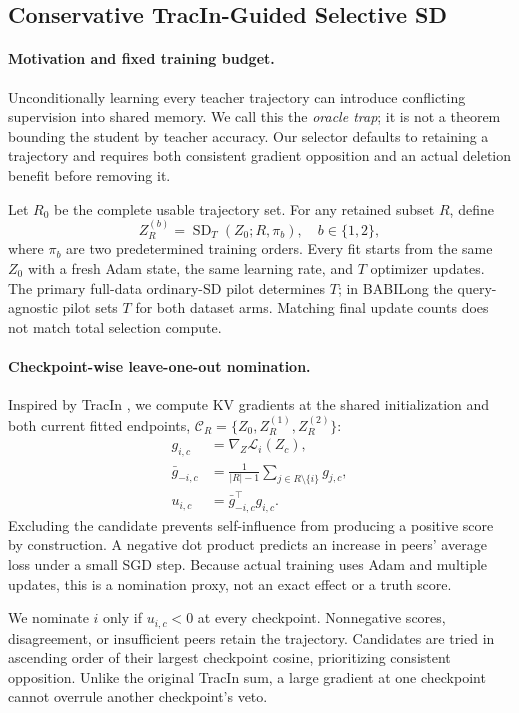 \subsection{Conservative TracIn-Guided Selective SD}

\paragraph{Motivation and fixed training budget.}
Unconditionally learning every teacher trajectory can introduce conflicting supervision into shared memory. We call this the \emph{oracle trap}; it is not a theorem bounding the student by teacher accuracy. Our selector defaults to retaining a trajectory and requires both consistent gradient opposition and an actual deletion benefit before removing it.

Let $R_0$ be the complete usable trajectory set. For any retained subset $R$, define
\begin{equation}
Z_R^{(b)}=\operatorname{SD}_T(Z_0;R,\pi_b),\quad b\in\{1,2\},
\end{equation}
where $\pi_b$ are two predetermined training orders. Every fit starts from the same $Z_0$ with a fresh Adam state, the same learning rate, and $T$ optimizer updates. The primary full-data ordinary-SD pilot determines $T$; in BABILong the query-agnostic pilot sets $T$ for both dataset arms. Matching final update counts does not match total selection compute.

\paragraph{Checkpoint-wise leave-one-out nomination.}
Inspired by TracIn \citep{pruthi2020tracin}, we compute KV gradients at the shared initialization and both current fitted endpoints, $\mathcal C_R=\{Z_0,Z_R^{(1)},Z_R^{(2)}\}$:
\begin{align}
g_{i,c}&=\nabla_Z\mathcal L_i(Z_c),\\
\bar g_{-i,c}&=\frac{1}{|R|-1}\sum_{j\in R\setminus\{i\}}g_{j,c},\\
u_{i,c}&=\bar g_{-i,c}^{\top}g_{i,c}.
\end{align}
Excluding the candidate prevents self-influence from producing a positive score by construction. A negative dot product predicts an increase in peers' average loss under a small SGD step. Because actual training uses Adam and multiple updates, this is a nomination proxy, not an exact effect or a truth score.

We nominate $i$ only if $u_{i,c}<0$ at every checkpoint. Nonnegative scores, disagreement, or insufficient peers retain the trajectory. Candidates are tried in ascending order of their largest checkpoint cosine, prioritizing consistent opposition. Unlike the original TracIn sum, a large gradient at one checkpoint cannot overrule another checkpoint's veto.

